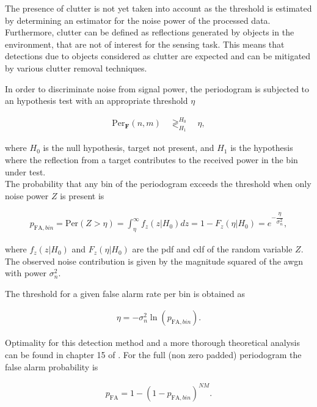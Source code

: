 				The presence of clutter is not yet taken into account as the threshold is estimated by determining an estimator for the noise power of the processed data. 
				Furthermore, clutter can be defined as reflections generated by objects in the environment, that are not of interest for the sensing task. 
				This means that detections due to objects considered as clutter are expected and can be mitigated by various clutter removal techniques.
				
				In order to discriminate noise from signal power, the periodogram is subjected to an hypothesis test with an appropriate threshold $\eta$
				
				\begin{align*}
					\text{Per}_{\mathbf F}(n,m) \quad\mathop{\gtrless}_{H_1}^{H_0}  \quad \eta,
				\end{align*}
				
				where $H_0$ is the null hypothesis, target not present, and $H_1$ is the hypothesis where the reflection from a target contributes to the received power in the bin under test.\\
				The probability that any bin of the periodogram exceeds the threshold when only noise power $Z$ is present is
				
				\begin{align*}
					p_{\text{FA},bin} = \text{Per}(Z > \eta) = \int_\eta^{\infty} f_z(z|H_0)dz = 1 - F_z(\eta | H_0) = e^{-\dfrac{\eta}{\sigma_n^2}},
				\end{align*}
				 
				where $f_z(z|H_0)$ and $F_z(\eta | H_0)$ are the \gls{pdf} and \gls{cdf} of the random variable $Z$. 
				The observed noise contribution is given by the magnitude squared of the \gls{awgn} with power $\sigma_n^2$.
				 
				The threshold for a given false alarm rate per bin is obtained as
				
				\begin{align*}
					\eta = -\sigma_n^2 \ln(p_{\text{FA},bin}) .
				\end{align*} 
				
				Optimality for this detection method and a more thorough theoretical analysis can be found in chapter 15 of \cite{Richards_Scheer_Holm_2010}.
				For the full (non zero padded) periodogram the false alarm probability is
				
				\begin{align*}
					p_\text{FA} = 1 - (1 - p_{\text{FA},bin})^{NM}.
				\end{align*}
				
